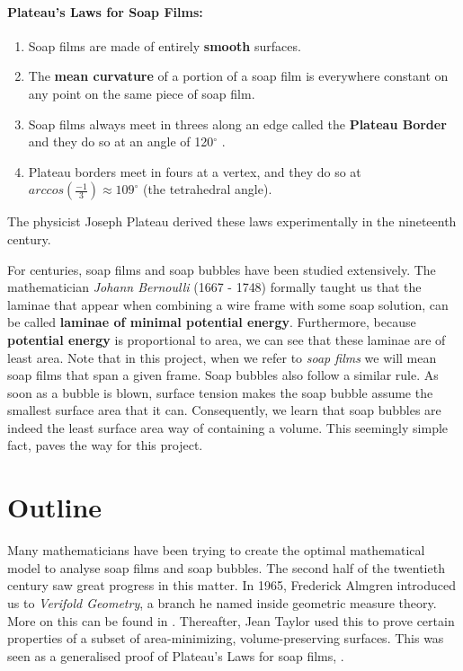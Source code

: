 \documentclass[a4paper,12pt]{report}
\begin{document}
\paragraph{Plateau's Laws for Soap Films:}

\begin{enumerate}[label=(\roman*)]
\item Soap films are made of entirely \textbf{smooth} surfaces.
\item The \textbf{mean curvature} of a portion of a soap film is everywhere constant on any point on the same piece of soap film.
\item Soap films always meet in threes along an edge called the \textbf{Plateau Border} and they do so at an angle of 120$^{\circ}$ .
\item Plateau borders meet in fours at a vertex, and they do so at $arccos(\frac{-1}{3}) \approx109^{\circ} $ (the tetrahedral angle).
\end{enumerate}

\hspace{-0.66cm}The physicist Joseph Plateau derived these laws experimentally in the nineteenth century.\par
\hspace{-0.66cm}For centuries, soap films and soap bubbles have been studied extensively. The mathematician \textit{Johann Bernoulli} (1667 - 1748) formally taught us that the laminae that appear when combining a wire frame with some soap solution, can be called \textbf{laminae of minimal potential energy}. Furthermore, because \textbf{potential energy} is proportional to area, we can see that these laminae are of least area. Note that in this project, when we refer to \textit{soap films} we will mean soap films that span a given frame.
Soap bubbles also follow a similar rule. As soon as a bubble is blown, surface tension makes the soap bubble assume the smallest surface area that it can. Consequently, we learn that soap bubbles are indeed the least surface area way of containing a volume. This seemingly simple fact, paves the way for this project.\par

\section{Outline}

Many mathematicians have been trying to create the optimal mathematical model to analyse soap films and soap bubbles. The second half of the twentieth century saw great progress in this matter. In 1965, Frederick Almgren introduced us to \textit{Verifold Geometry}, a branch he named inside geometric measure theory. More on this can be found in \cite{verifold}. Thereafter, Jean Taylor used this to prove certain properties of a subset of area-minimizing, volume-preserving surfaces. This was seen as a generalised proof of Plateau's Laws for soap films, \cite{taylor}.\newline 
\end{document}
